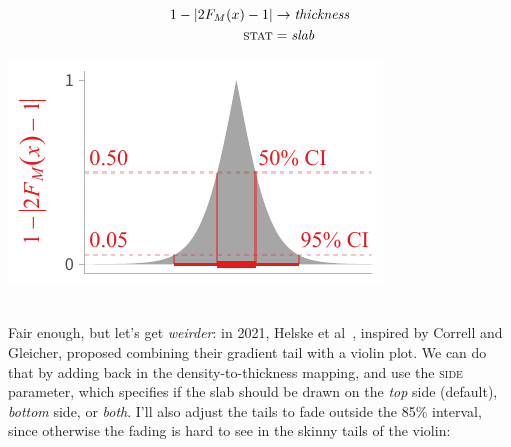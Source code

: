 \documentclass[journal]{vgtc}                     %
\newcommand{\equationfigure}[2]{%
\noindent
\begin{minipage}{.5\columnwidth}
\setlength{\abovedisplayskip}{0pt}
\setlength{\belowdisplayskip}{0pt}
#1\end{minipage}%
\begin{minipage}{.4\columnwidth}\centering #2 \end{minipage}%
\vspace{.5\belowdisplayskip}\\
}
\begin{document}
\equationfigure{
\begin{align*}
1 - \lvert 2 F_M(x) - 1 \rvert &\rightarrow \textit{thickness}\\
\textsc{stat} &= \mathit{slab}
\end{align*}
}{\includegraphics[width=1.2\columnwidth]{figs/3-slab_consonance.pdf}}
Fair enough, but let's get \textit{weirder}: in 2021, Helske et al~\cite{helske2021can}, inspired by Correll and Gleicher, proposed combining their gradient tail with a violin plot. We can do that by adding back in the density-to-thickness mapping, and use the \textsc{side} parameter, which specifies if the slab should be drawn on the \textit{top} side (default), \textit{bottom} side, or \textit{both}. I'll also adjust the tails to fade outside the 85\% interval, since otherwise the fading is hard to see in the skinny tails of the violin:
\end{document}
